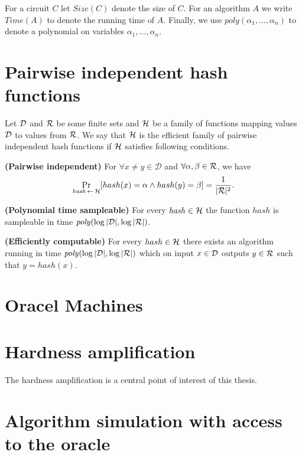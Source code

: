 For a circuit $C$ let $\mathit{Size}(C)$ denote the size of $C$. For an algorithm $A$ we write $\mathit{Time}(A)$ to denote the running time of $A$.
Finally, we use $\mathit{poly}(\alpha_1, \dots, \alpha_n)$ to denote a polynomial on variables $\alpha_1, \dots, \alpha_n$.

\section{Pairwise independent hash functions}
\begin{definition}
Let $\mathcal{D}$ and $\mathcal{R}$ be some finite sets and $\mathcal{H}$ be a family of functions mapping values $\mathcal{D}$ to values from $\mathcal{R}$.
We say that $\mathcal{H}$ is \textnormal{the efficient family of pairwise independent hash functions}
if $\mathcal{H}$ satisfies following conditions.

\textbf{(Pairwise independent)} For $\forall x \neq y \in \mathcal{D}$ and $\forall \alpha, \beta \in \mathcal{R}$, we have
\begin{displaymath}
\underset{\hash \la0 \cH}{\Pr}[hash(x) = \alpha \land hash(y) = \beta] = \frac{1}{|\cR|^2}.
\end{displaymath}

\textbf{(Polynomial time sampleable)} For every $\mathit{hash} \in \mathcal{H}$ the function $\mathit{hash}$ is sampleable in time $\mathit{poly}(\log|\mathcal{D}|, \log|\mathcal{R}|)$.

\textbf{(Efficiently computable)}
For every $hash \in \mathcal{H}$ there exists an algorithm running in time $\mathit{poly}(\log|\mathcal{D}|, \log|\mathcal{R}|)$ which
on input $x \in \mathcal{D}$ outputs $y \in \mathcal{R}$ such that $y = hash(x)$.
\end{definition}

\section{Oracel Machines}

\section{Hardness amplification}
The hardness amplification is a central point of interest of this thesis.

\section{Algorithm simulation with access to the oracle}

